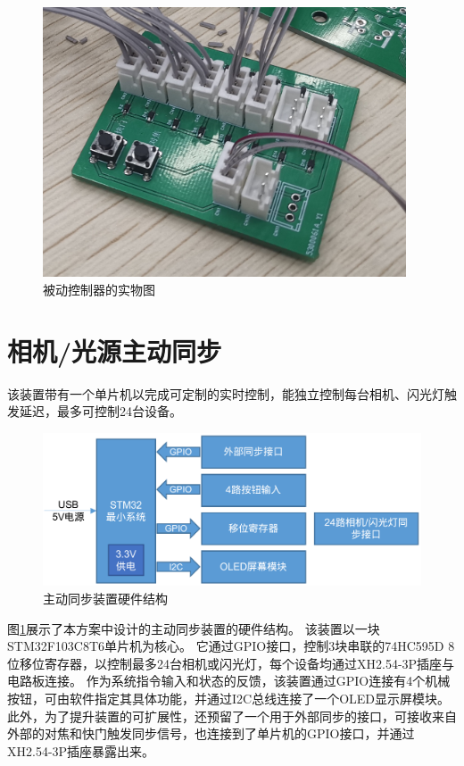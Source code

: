 \documentclass{ctexart}
\begin{document}
\begin{figure}
    \centering
    \includegraphics[height=8cm]{figures/passive_sync_controller}
    \caption{被动控制器的实物图}
\end{figure}

\section{相机/光源主动同步}

该装置带有一个单片机以完成可定制的实时控制，能独立控制每台相机、闪光灯触发延迟，最多可控制24台设备。
\begin{figure}
    \centering
    \includegraphics[width=0.8\linewidth]{figures/active_sync.png}
    \caption{主动同步装置硬件结构}
    \label{fig:active_sync}
\end{figure}
图\ref{fig:active_sync}展示了本方案中设计的主动同步装置的硬件结构。
该装置以一块STM32F103C8T6单片机为核心。
它通过GPIO接口，控制3块串联的74HC595D 8位移位寄存器，以控制最多24台相机或闪光灯，每个设备均通过XH2.54-3P插座与电路板连接。
作为系统指令输入和状态的反馈，该装置通过GPIO连接有4个机械按钮，可由软件指定其具体功能，并通过I2C总线连接了一个OLED显示屏模块。
此外，为了提升装置的可扩展性，还预留了一个用于外部同步的接口，可接收来自外部的对焦和快门触发同步信号，也连接到了单片机的GPIO接口，并通过XH2.54-3P插座暴露出来。
\end{document}
